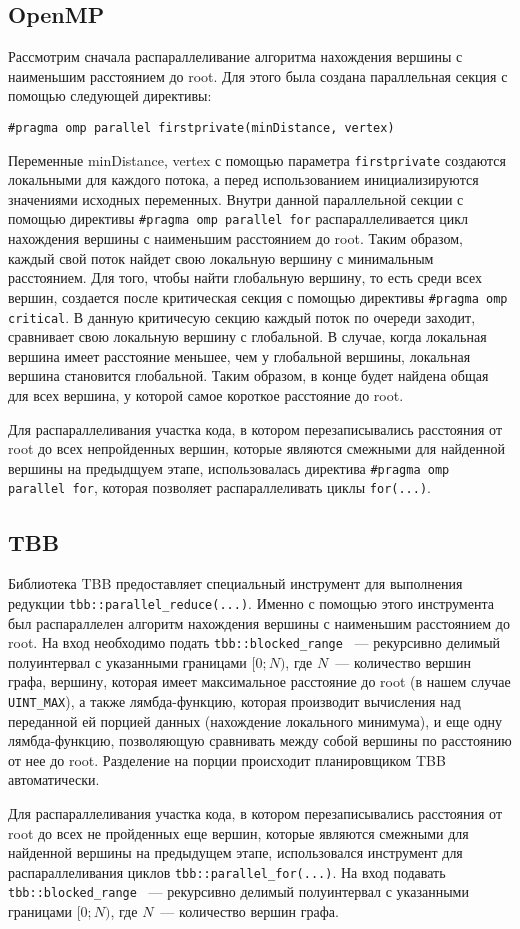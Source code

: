 \documentclass{report}
\begin{document}
\subsection*{OpenMP}
Рассмотрим сначала распараллеливание алгоритма нахождения вершины с наименьшим расстоянием до root. Для этого была создана параллельная секция с помощью следующей директивы:
\par \verb|#pragma omp parallel firstprivate(minDistance, vertex)| 
\par Переменные minDistance, vertex с помощью параметра \verb|firstprivate| создаются локальными для каждого потока, а перед использованием инициализируются значениями исходных переменных. Внутри данной параллельной секции с помощью директивы \verb|#pragma omp parallel for| распараллеливается цикл нахождения вершины с наименьшим расстоянием до root. Таким образом, каждый свой поток найдет свою локальную вершину с минимальным расстоянием. Для того, чтобы найти глобальную вершину, то есть среди всех вершин, создается после критическая секция с помощью директивы \verb|#pragma omp critical|. В данную критичесую секцию каждый поток по очереди заходит, сравнивает свою локальную вершину с глобальной. В случае, когда локальная вершина имеет расстояние меньшее, чем у глобальной вершины, локальная вершина становится глобальной. Таким образом, в конце будет найдена общая для всех вершина, у которой самое короткое расстояние до root.
\par Для распараллеливания участка кода, в котором перезаписывались расстояния от root до всех непройденных вершин, которые являются смежными для найденной вершины на предыдщуем этапе, использовалась директива \verb|#pragma omp parallel for|, которая позволяет распараллеливать циклы \verb|for(...)|.

\subsection*{TBB}
Библиотека TBB предоставляет специальный инструмент для выполнения редукции \verb|tbb::parallel_reduce(...)|. Именно с помощью этого инструмента был распараллелен алгоритм нахождения вершины с наименьшим расстоянием до root. На вход необходимо подать \verb|tbb::blocked_range| ~--- рекурсивно делимый полуинтервал с указанными границами $[0; N)$, где $N$~--- количество вершин графа, вершину, которая имеет максимальное расстояние до root (в нашем случае \verb|UINT_MAX|), а также лямбда-функцию, которая производит вычисления над переданной ей порцией данных (нахождение локального минимума), и еще одну лямбда-функцию, позволяющую сравнивать между собой вершины по расстоянию от нее до root. Разделение на порции происходит планировщиком TBB автоматически.
\par Для распараллеливания участка кода, в котором перезаписывались расстояния от root до всех не пройденных еще вершин, которые являются смежными для найденной вершины на предыдущем этапе, использовался инструмент для распараллеливания циклов \verb|tbb::parallel_for(...)|. На вход подавать \verb|tbb::blocked_range| ~--- рекурсивно делимый полуинтервал с указанными границами $[0; N)$, где $N$~--- количество вершин графа.
\end{document}
